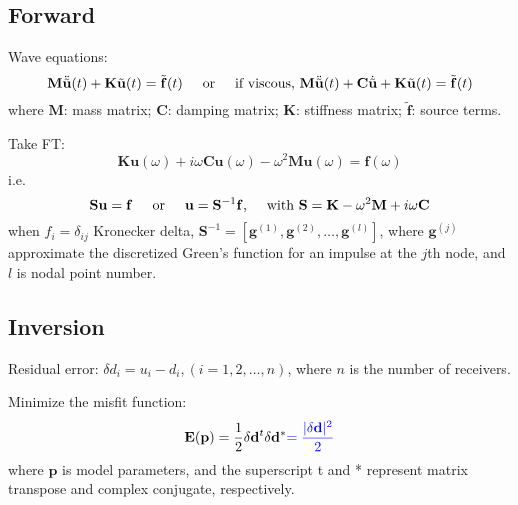 \documentclass{article}
\newcommand{\mbf}[1]{\mathbf{#1}}
\newcommand{\myno}[1]{{\color{blue}#1}}
\begin{document}
\subsection{Forward}
Wave equations:
\[ \mbf M\ddot{\tilde{\mbf u}}(t)+\mbf K\tilde{\mbf u}(t)=\tilde{\mbf f}(t) \text{\hspace{5mm}or\hspace{5mm}if viscous,~} \mbf M\ddot{\tilde{\mbf u}}(t)+\mbf C\dot{\tilde{\mbf u}}+\mbf K\tilde{\mbf u}(t)=\tilde{\mbf f}(t) \]
where $\mbf M$: mass matrix; $\mbf C$: damping matrix; $\mbf K$: stiffness matrix; $\tilde{\mbf f}$: source terms.\par
Take FT:
\[ \mbf K\mbf u(\omega)+i\omega\mbf C\mbf u(\omega)-\omega^2\mbf M\mbf u(\omega)=\mbf f(\omega) \]
i.e.
\[ \mbf S\mbf u=\mbf f \text{\hspace{5mm}or\hspace{5mm}} \mbf u=\mbf S^{-1}\mbf f \text{,\hspace{5mm}with~} \mbf S=\mbf K-\omega^2\mbf M+i\omega\mbf C \]
when $f_i=\delta_{ij}$ Kronecker delta, $\mbf S^{-1}=[\mbf g^{(1)},\mbf g^{(2)},\ldots,\mbf g^{(l)}]$, where $\mbf g^{(j)}$ approximate the discretized Green's function for an impulse at the $j$th node, and $l$ is nodal point number.\par
\subsection{Inversion}
Residual error: $\delta d_i=u_i-d_i,(i=1,2,\ldots,n)$, where $n$ is the number of receivers.\par
Minimize the misfit function:
\[ \mbf E(\mbf p)=\frac{1}{2}\delta\mbf d^t\delta\mbf d^*\myno{=\frac{|\delta\mbf d|^2}{2}} \]
where $\mbf p$ is model parameters, and the superscript t and * represent matrix transpose and complex conjugate, respectively.\par
\end{document}
